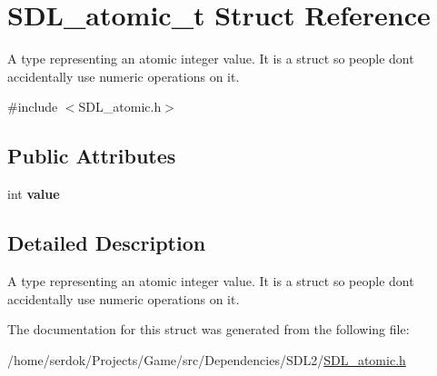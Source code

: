 \hypertarget{structSDL__atomic__t}{}\section{S\+D\+L\+\_\+atomic\+\_\+t Struct Reference}
\label{structSDL__atomic__t}


A type representing an atomic integer value. It is a struct so people don\textquotesingle{}t accidentally use numeric operations on it.  




{\ttfamily \#include $<$S\+D\+L\+\_\+atomic.\+h$>$}

\subsection*{Public Attributes}
\begin{DoxyCompactItemize}
\item 
\mbox{\label{structSDL__atomic__t_a0d09ddf3cc5798c709edb7cea104203a}} 
int {\bfseries value}
\end{DoxyCompactItemize}


\subsection{Detailed Description}
A type representing an atomic integer value. It is a struct so people don\textquotesingle{}t accidentally use numeric operations on it. 

The documentation for this struct was generated from the following file\+:\begin{DoxyCompactItemize}
\item 
/home/serdok/\+Projects/\+Game/src/\+Dependencies/\+S\+D\+L2/\hyperlink{SDL__atomic_8h}{S\+D\+L\+\_\+atomic.\+h}\end{DoxyCompactItemize}
